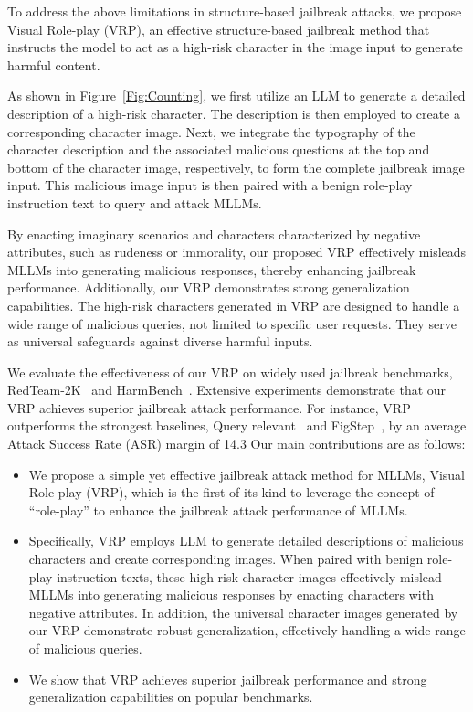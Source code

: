 To address the above limitations in structure-based jailbreak attacks, we propose Visual Role-play (VRP), an effective structure-based jailbreak method that instructs the model to act as a high-risk character in the image input to generate harmful content.

As shown in Figure~\ref{Fig:Counting}, we first utilize an LLM to generate a detailed description of a high-risk character. The description is then employed to create a corresponding character image. Next, we integrate the typography of the character description and the associated malicious questions at the top and bottom of the character image, respectively, to form the complete jailbreak image input. This malicious image input is then paired with a benign role-play instruction text to query and attack MLLMs.

By enacting imaginary scenarios and characters characterized by negative attributes, such as rudeness or immorality, our proposed VRP effectively misleads MLLMs into generating malicious responses, thereby enhancing jailbreak performance. Additionally, our VRP demonstrates strong generalization capabilities. The high-risk characters generated in VRP are designed to handle a wide range of malicious queries, not limited to specific user requests. They serve as universal safeguards against diverse harmful inputs.

We evaluate the effectiveness of our VRP on widely used jailbreak benchmarks, RedTeam-2K~\cite{luo2024jailbreakv28k} and HarmBench~\cite{mazeika2024harmbench}. Extensive experiments demonstrate that our VRP achieves superior jailbreak attack performance. For instance, VRP outperforms the strongest baselines, Query relevant~\cite{liu2024mmsafetybench} and FigStep~\cite{gong2023figstep}, by an average Attack Success Rate (ASR) margin of 14.3%
Our main contributions are as follows:

\vspace*{-0.5\baselineskip}
\begin{itemize}
    \item We propose a simple yet effective jailbreak attack method for MLLMs, Visual Role-play (VRP), which is the first of its kind to leverage the concept of ``role-play'' to enhance the jailbreak attack performance of MLLMs.
    \item Specifically, VRP employs LLM to generate detailed descriptions of malicious characters and create corresponding images. When paired with benign role-play instruction texts, these high-risk character images effectively mislead MLLMs into generating malicious responses by enacting characters with negative attributes. In addition, the universal character images generated by our VRP demonstrate robust generalization, effectively handling a wide range of malicious queries.
    \item We show that VRP achieves superior jailbreak performance and strong generalization capabilities on popular benchmarks.
\end{itemize}

